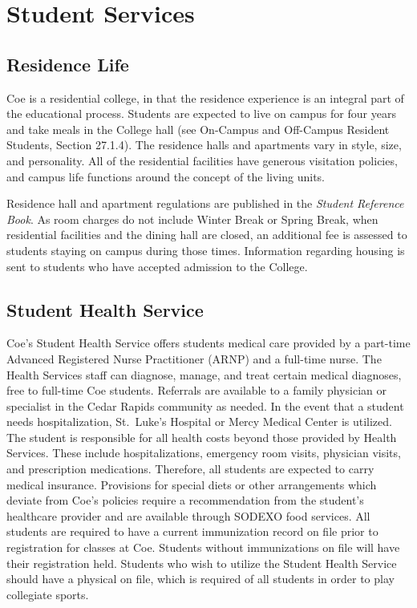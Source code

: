 \documentclass[
  letterpaper,
]{scrbook}
\begin{document}
\section{Student Services}\label{student-services}

\subsection{Residence Life}\label{residence-life}

Coe is a residential college, in that the residence experience is an
integral part of the educational process. Students are expected to live
on campus for four years and take meals in the College hall (see
On-Campus and Off-Campus Resident Students, Section 27.1.4). The
residence halls and apartments vary in style, size, and personality. All
of the residential facilities have generous visitation policies, and
campus life functions around the concept of the living units.

Residence hall and apartment regulations are published in the
\emph{Student Reference Book}. As room charges do not include Winter
Break or Spring Break, when residential facilities and the dining hall
are closed, an additional fee is assessed to students staying on campus
during those times. Information regarding housing is sent to students
who have accepted admission to the College.

\subsection{Student Health Service}\label{student-health-service}

Coe's Student Health Service offers students medical care provided by a
part-time Advanced Registered Nurse Practitioner (ARNP) and a full-time
nurse. The Health Services staff can diagnose, manage, and treat certain
medical diagnoses, free to full-time Coe students. Referrals are
available to a family physician or specialist in the Cedar Rapids
community as needed. In the event that a student needs hospitalization,
St.~Luke's Hospital or Mercy Medical Center is utilized. The student is
responsible for all health costs beyond those provided by Health
Services. These include hospitalizations, emergency room visits,
physician visits, and prescription medications. Therefore, all students
are expected to carry medical insurance. Provisions for special diets or
other arrangements which deviate from Coe's policies require a
recommendation from the student's healthcare provider and are available
through SODEXO food services. All students are required to have a
current immunization record on file prior to registration for classes at
Coe. Students without immunizations on file will have their registration
held. Students who wish to utilize the Student Health Service should
have a physical on file, which is required of all students in order to
play collegiate sports.
\end{document}
